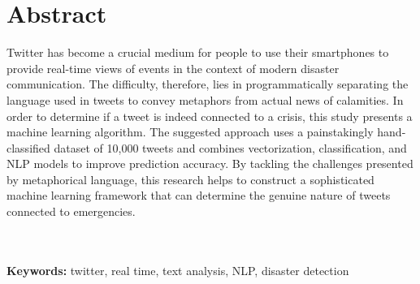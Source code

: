 \chapter*{\center \Large  Abstract}

Twitter has become a crucial medium for people to use their smartphones to provide real-time views of events in the context of modern disaster communication. The difficulty, therefore, lies in programmatically separating the language used in tweets to convey metaphors from actual news of calamities. In order to determine if a tweet is indeed connected to a crisis, this study presents a machine learning algorithm. The suggested approach uses a painstakingly hand-classified dataset of 10,000 tweets and combines vectorization, classification, and NLP models to improve prediction accuracy. By tackling the challenges presented by metaphorical language, this research helps to construct a sophisticated machine learning framework that can determine the genuine nature of tweets connected to emergencies.

~\\[1cm]%

~\\[1cm]
\noindent %
\textbf{Keywords:} twitter, real time, text analysis, NLP, disaster detection

\vfill
\noindent



